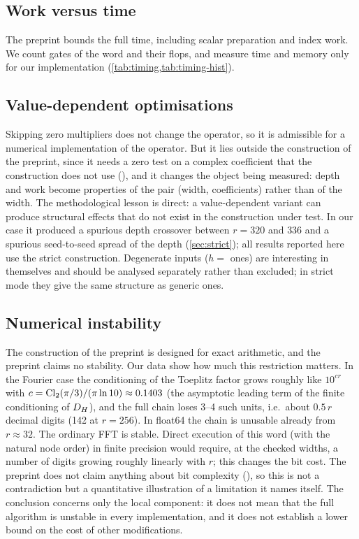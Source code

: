 \documentclass[11pt]{article}
\theoremstyle{plain}
\begin{document}
\subsection{Work versus time}
The preprint bounds the full time, including scalar preparation and index work. We count gates of the word and their flops, and measure time and memory only for our implementation (\cref{tab:timing,tab:timing-hist}).

\subsection{Value-dependent optimisations}\label{sec:disc-value}
Skipping zero multipliers does not change the operator, so it is admissible for a numerical implementation of the operator. But it lies outside the construction of the preprint, since it needs a zero test on a complex coefficient that the construction does not use (), and it changes the object being measured: depth and work become properties of the pair (width, coefficients) rather than of the width. The methodological lesson is direct: a value-dependent variant can produce structural effects that do not exist in the construction under test. In our case it produced a spurious depth crossover between $r=320$ and $336$ and a spurious seed-to-seed spread of the depth (\cref{sec:strict}); all results reported here use the strict construction. Degenerate inputs ($h=$ ones) are interesting in themselves and should be analysed separately rather than excluded; in strict mode they give the same structure as generic ones.

\subsection{Numerical instability}\label{sec:disc-instability}
The construction of the preprint is designed for exact arithmetic, and the preprint claims no stability. Our data show how much this restriction matters. In the Fourier case the conditioning of the Toeplitz factor grows roughly like $10^{cr}$ with $c=\operatorname{Cl}_2(\pi/3)/(\pi\ln10)\approx0.1403$ (the asymptotic leading term of the finite conditioning of $D_H$), and the full chain loses 3--4 such units, i.e.\ about $0.5\,r$ decimal digits (142 at $r=256$). In float64 the chain is unusable already from $r\approx32$. The ordinary FFT is stable. Direct execution of this word (with the natural node order) in finite precision would require, at the checked widths, a number of digits growing roughly linearly with $r$; this changes the bit cost. The preprint does not claim anything about bit complexity (), so this is not a contradiction but a quantitative illustration of a limitation it names itself. The conclusion concerns only the local component: it does not mean that the full algorithm is unstable in every implementation, and it does not establish a lower bound on the cost of other modifications.
\end{document}
